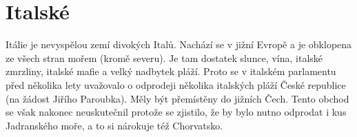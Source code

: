 \documentclass[10.5pt]{book}
\begin{document}
\iffalse
\begin{poem}{Toxicity}{System of a Down}

\settowidth{\versewidth}{Flashlight reveries caught in the headlights of a truck}

Conversion, software version 7.0\\*
Looking at life through the eyes of a tired hub\\*
Eating seeds as a pastime activity\\*
The toxicity of our city, our city

Ref.:\\*
You, what do you own the world?\\*
How do you own disorder, disorder\\*
Now somewhere between the sacred silence\\*
Sacred silence and sleep\\*
Somewhere, between the sacred silence and sleep\\*
Disorder, disorder, disorder

More wood for the fires, loud neighbors\\*
Flashlight reveries caught in the headlights of a truck\\*
Eating seeds as a pastime activity\\*
The toxicity of our city, of our city

Ref.

Ref.

When I became the sun\\*
I shone life into the man's hearts\\*
When I became the sun\\*
I shone life into the man's hearts

\end{poem}
\fi
\section{Italské}

Itálie je nevyspělou zemí divokých Italů. Nachází se v jižní Evropě a je
obklopena ze všech stran mořem (kromě severu). Je tam dostatek slunce, vína,
italské zmrzliny, italské mafie a velký nadbytek pláží. Proto se v italském
parlamentu před několika lety uvažovalo o odprodeji několika italských pláží
České republice (na žádost Jiřího Paroubka). Měly být přemístěny do jižních
Čech. Tento obchod se však nakonec neuskutečnil protože se zjistilo, že by bylo
nutno odprodat i kus Jadranského moře, a to si nárokuje též Chorvatsko. 
\end{document}

